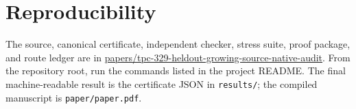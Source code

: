 \documentclass[10pt]{article}
\newcommand{\1}{\mathbf 1}
\begin{document}
\section{Reproducibility}

The source, canonical certificate, independent checker, stress suite, proof
package, and route ledger are in
\url{papers/tpc-329-heldout-growing-source-native-audit}.  From the
repository root, run the commands listed in the project README.  The final
machine-readable result is the certificate JSON in \texttt{results/}; the
compiled manuscript is \texttt{paper/paper.pdf}.



\end{document}
